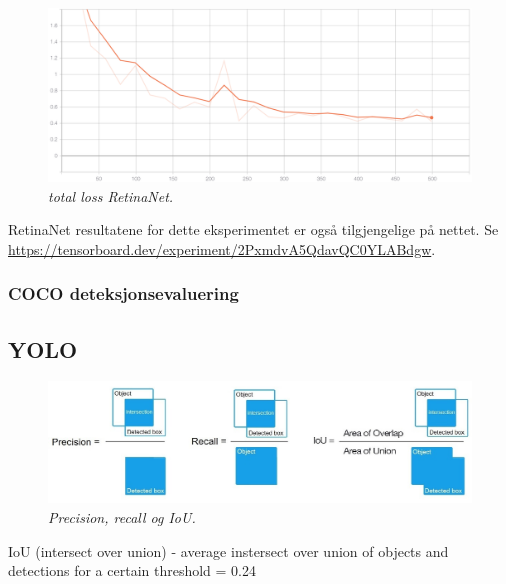 \begin{figure}[h!]
\begin{center} 
\includegraphics[scale=0.35]{figures/total_loss_retinanet_8}
\caption{\small \sl total loss RetinaNet. \label{fig:total_loss_retinanet}}
\end{center}
\end{figure}

RetinaNet resultatene for dette eksperimentet er også tilgjengelige på nettet. Se \\ \url{https://tensorboard.dev/experiment/2PxmdvA5QdavQC0YLABdgw}.

\subsubsection{COCO deteksjonsevaluering} 

\subsection{YOLO}

\begin{figure}[h!]
\begin{center} 
\includegraphics[scale=1.0]{figures/precision}
\caption{\small \sl Precision, recall og IoU. \cite{Bochkovskiy 2020} \label{fig:precision}}
\end{center}
\end{figure}

IoU (intersect over union) - average instersect over union of objects and detections for a certain threshold = 0.24

